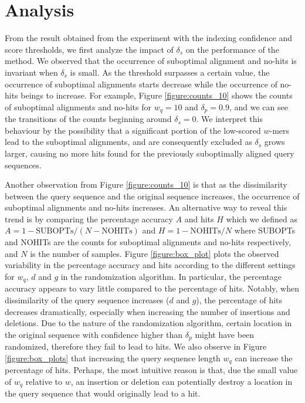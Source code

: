 \documentclass{article}
\begin{document}
\section{Analysis}

From the result obtained from the experiment with the indexing confidence and score thresholds, we first analyze the impact of $\delta_s$ on the performance of the method. We observed that the occurrence of suboptimal alignment and no-hits is invariant when $\delta_s$ is small. As the threshold surpasses a certain value, the occurrence of suboptimal alignments starts decrease while the occurrence of no-hits beings to increase. For example, Figure \ref{figure:counts_10} shows the counts of suboptimal alignments and no-hits for $w_q = 10$ and $\delta_p = 0.9$, and we can see the transitions of the counts beginning around $\delta_s = 0$. We interpret this behaviour by the possibility that a significant portion of the low-scored $w$-mers lead to the suboptimal alignments, and are consequently excluded as $\delta_s$ grows larger, causing no more hits found for the previously suboptimally aligned query sequences. 

Another observation from Figure \ref{figure:counts_10} is that as the dissimilarity between the query sequence and the original sequence increases, the occurrence of suboptimal alignments and no-hits increases. An alternative way to reveal this trend is by comparing the percentage accuracy $A$ and hits $H$ which we defined as $A = 1 - \mbox{SUBOPTs}/(N - \mbox{NOHITs})$ and $H = 1 - \mbox{NOHITs}/N$ where SUBOPTs and NOHITs are the counts for suboptimal alignments and no-hits respectively, and $N$ is the number of samples. Figure \ref{figure:box_plot} plots the observed variability in the percentage accuracy and hits according to the different settings for $w_q$,  $d$ and $g$ in the randomization algorithm. In particular, the percentage accuracy appears to vary little compared to the percentage of hits. Notably, when dissimilarity of the query sequence increases ($d$ and $g$), the percentage of hits decreases dramatically, especially when increasing the number of insertions and deletions. Due to the nature of the randomization algorithm, certain location in the original sequence with confidence higher than $\delta_p$ might have been randomized, therefore they fail to lead to hits. We also observe in Figure \ref{figure:box_plots} that increasing the query sequence length $w_q$ can increase the percentage of hits. Perhaps, the most intuitive reason is that, due the small value of $w_q$ relative to $w$, an insertion or deletion can potentially destroy a location in the query sequence that would originally lead to a hit. 
\end{document}
